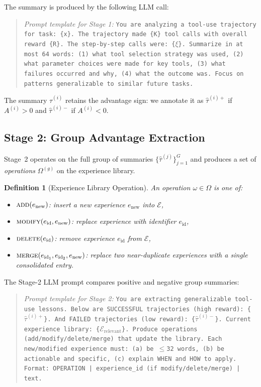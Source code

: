 \documentclass[11pt]{article}
\newtheorem{definition}{Definition}
\begin{document}
The summary is produced by the following LLM call:

\begin{quote}
\textit{Prompt template for Stage 1:}
\texttt{You are analyzing a tool-use trajectory for task: \{x\}. The
trajectory made \{K\} tool calls with overall reward \{R\}. The step-by-step
calls were: \{$\xi$\}. Summarize in at most 64 words: (1) what tool selection
strategy was used, (2) what parameter choices were made for key tools, (3) what
failures occurred and why, (4) what the outcome was. Focus on patterns
generalizable to similar future tasks.}
\end{quote}

The summary $\hat{\tau}^{(i)}$ retains the advantage sign: we annotate it as
$\hat{\tau}^{(i)+}$ if $A^{(i)} > 0$ and $\hat{\tau}^{(i)-}$ if $A^{(i)} < 0$.

\subsection{Stage 2: Group Advantage Extraction}
\label{sec:stage2}

Stage~2 operates on the full group of summaries $\{\hat{\tau}^{(j)}\}_{j=1}^G$
and produces a set of \emph{operations} $\Omega^{(g)}$ on the experience library.

\begin{definition}[Experience Library Operation]
\label{def:operation}
An operation $\omega \in \Omega$ is one of:
\begin{itemize}[leftmargin=1.5em]
    \item $\textsc{add}(e_{\text{new}})$: insert a new experience $e_{\text{new}}$ into $\mathcal{E}$,
    \item $\textsc{modify}(e_{\text{id}}, e_{\text{new}})$: replace experience with identifier $e_{\text{id}}$,
    \item $\textsc{delete}(e_{\text{id}})$: remove experience $e_{\text{id}}$ from $\mathcal{E}$,
    \item $\textsc{merge}(e_{\text{id}_1}, e_{\text{id}_2}, e_{\text{new}})$: replace two near-duplicate
          experiences with a single consolidated entry.
\end{itemize}
\end{definition}

The Stage-2 LLM prompt compares positive and negative group summaries:

\begin{quote}
\textit{Prompt template for Stage 2:}
\texttt{You are extracting generalizable tool-use lessons. Below are
SUCCESSFUL trajectories (high reward): \{$\hat{\tau}^{(i)+}$\}. And FAILED
trajectories (low reward): \{$\hat{\tau}^{(i)-}$\}. Current experience library:
\{$\mathcal{E}_{\text{relevant}}$\}. Produce operations (add/modify/delete/merge)
that update the library. Each new/modified experience must: (a) be $\leq$32
words, (b) be actionable and specific, (c) explain WHEN and HOW to apply.
Format: OPERATION | experience\_id (if modify/delete/merge) | text.}
\end{quote}
\end{document}
